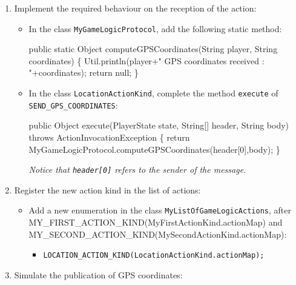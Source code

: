 \begin{enumerate}
\item Implement the required behaviour on the reception of the \textsf{action}:

\begin{itemize}
\item In the class \texttt{MyGameLogicProtocol}, add the following
  static method:
\begin{shellcmd}
public static Object computeGPSCoordinates(String player, String coordinates) \{
      Util.println(player+" GPS coordinates received : "+coordinates);
      return null;
\}
\end{shellcmd}
\item In the class \texttt{LocationActionKind}, complete the method
  \texttt{execute} of \texttt{SEND\_GPS\_COORDINATES}:
\begin{shellcmd}
public Object execute(PlayerState state, String[] header, String body) 
                     throws ActionInvocationException \{
    return MyGameLogicProtocol.computeGPSCoordinates(header[0],body);
\}
\end{shellcmd} 
\textit{Notice that \texttt{header[0]} refers to the sender of the message.}
\end{itemize}


\item Register the new \textsf{action kind} in the list of actions:
\begin{itemize}
\item Add a new enumeration in the class \texttt{MyListOfGameLogicActions},
  after MY\_FIRST\_ACTION\_KIND(MyFirstActionKind.actionMap) and
  MY\_SECOND\_ACTION\_KIND(MySecondActionKind.actionMap):
\begin{itemize}
\item \texttt{LOCATION\_ACTION\_KIND(LocationActionKind.actionMap);}
\end{itemize}
\end{itemize}

\item Simulate the publication of GPS coordinates:


\end{enumerate}
